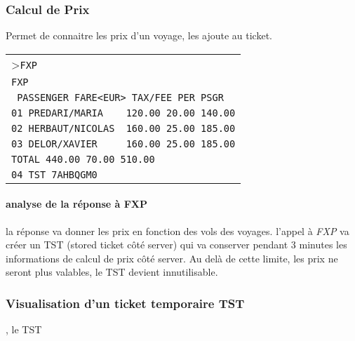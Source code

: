 \documentclass[a4paper,11pt]{article}
\begin{document}
\subsubsection*{Calcul de Prix}
Permet de connaitre les prix d'un voyage, les ajoute au ticket.

\begin{centering}
\begin{tabular}{|p{\linewidth}|}
 \hline
>\texttt{FXP} \\	
\texttt{FXP} \\	
\texttt{\hspace{10 mm}   PASSENGER        FARE<EUR>  TAX/FEE   PER PSGR} \\	
\texttt{01 PREDARI/MARIA\ \ \ \ 120.00\hspace{10 mm}    20.00\hspace{10 mm}     140.00} \\	
\texttt{02 HERBAUT/NICOLAS     \ 160.00\hspace{10 mm}    25.00\hspace{10 mm}     185.00} \\	
\texttt{03 DELOR/XAVIER   \ \ \ \ 160.00\hspace{10 mm}   25.00\hspace{10 mm}     185.00} \\	
\texttt{\hspace{18 mm}TOTAL\hspace{10 mm}        440.00\hspace{10 mm}   70.00\hspace{10 mm}     510.00} \\	
\texttt{04 TST 7AHBQGM0}\\
   \end{tabular}
\end{centering} 

\paragraph{analyse de la réponse à FXP}
la réponse va donner les prix en fonction des vols des voyages. l'appel à \textit{FXP} va créer un TST (stored ticket côté server) qui va conserver pendant 3 minutes les informations de calcul de prix côté server. Au delà de cette limite, les prix ne seront plus valables, le TST devient innutilisable.

\subsubsection*{Visualisation d'un ticket temporaire TST}, le TST 
\end{document}
